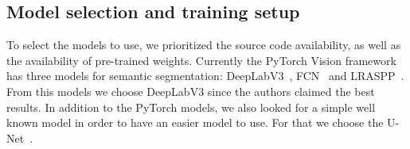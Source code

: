 \subsection{Model selection and training setup}
To select the models to use, we prioritized the source code availability, as well 
as the availability of pre-trained weights. Currently the PyTorch Vision framework has
three models for semantic segmentation: DeepLabV3~\cite{DeepLabV3}, FCN~\cite{fcn} and 
LRASPP~\cite{LRASPP}. From this models we choose DeepLabV3 since the authors claimed 
the best results. In addition to the PyTorch models, we also looked for a simple well 
known model in order to have an easier model to use. For that we choose the U-Net~\cite{unet}.